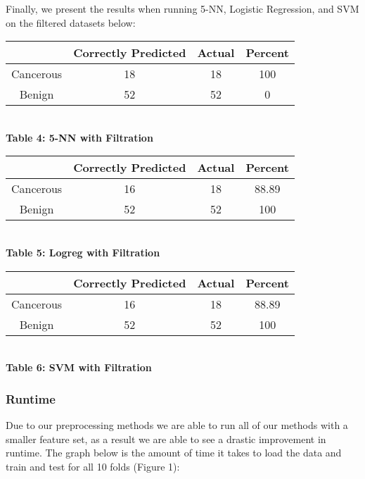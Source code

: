 \documentclass[12pt]{scrartcl}
\begin{document}
    Finally, we present the results when running 5-NN, Logistic Regression, and SVM on the filtered datasets below:
    
    \begin{center}
    \begin{tabular}{c|c|c|c}
    \hline
    & Correctly Predicted & Actual & Percent\\
    \hline
    Cancerous & 18 & 18 & 100\\
    Benign & 52 & 52 & 0\\
    \hline
    \end{tabular}\\
    \vspace{0.1in}
    \textbf{Table 4: 5-NN with Filtration}
    \end{center}
    
    \begin{center}
    \begin{tabular}{c|c|c|c}
    \hline
    & Correctly Predicted & Actual & Percent\\
    \hline
    Cancerous & 16 & 18 & 88.89\\
    Benign & 52 & 52 & 100\\
    \hline
    \end{tabular}\\
    \vspace{0.1in}
    \textbf{Table 5: Logreg with Filtration}
    \end{center}
    
    \begin{center}
    \begin{tabular}{c|c|c|c}
    \hline
    & Correctly Predicted & Actual & Percent\\
    \hline
    Cancerous & 16 & 18 & 88.89\\
    Benign & 52 & 52 & 100\\
    \hline
    \end{tabular}\\
    \vspace{0.1in}
    \textbf{Table 6: SVM with Filtration}
    \end{center}
    
    
    
    
    \subsubsection{Runtime}
    Due to our preprocessing methods we are able to run all of our methods with a smaller feature set, as a result we are able to see a drastic improvement in runtime. The graph below is the amount of time it takes to load the data and train and test for all 10 folds (Figure 1):
    
\end{document}
